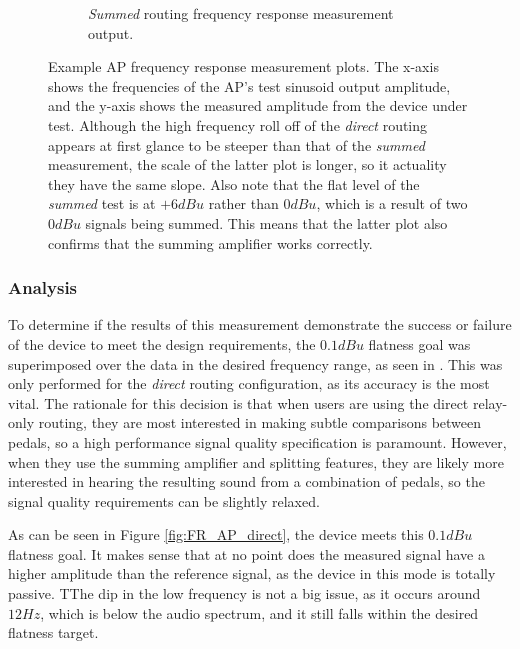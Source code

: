 \begin{figure}
\begin{subfigure}{0.45\textwidth}
				\caption{\emph{Summed} routing frequency response measurement output.}
				\label{fig:FR_AP_sum}
			\end{subfigure}
			\caption{Example AP frequency response measurement plots.  The x-axis shows the frequencies of the AP's test sinusoid output amplitude, and the y-axis shows the measured amplitude from the device under test.  Although the high frequency roll off of the \emph{direct} routing appears at first glance to be steeper than that of the \emph{summed} measurement, the scale of the latter plot is longer, so it actuality they have the same slope.  Also note that the flat level of the \emph{summed} test is at $+6dBu$ rather than $0dBu$, which is a result of two $0dBu$ signals being summed.  This means that the latter plot also confirms that the summing amplifier works correctly.}
			\label{fig:FR_AP}
		\end{figure}

		\subsubsection{Analysis}

		To determine if the results of this measurement demonstrate the success or failure of the device to meet the design requirements, the $0.1dBu$ flatness goal was superimposed over the data in the desired frequency range, as seen in .  This was only performed for the \emph{direct} routing configuration, as its accuracy is the most vital.  The rationale for this decision is that when users are using the direct relay-only routing, they are most interested in making subtle comparisons between pedals, so a high performance signal quality specification is paramount.  However, when they use the summing amplifier and splitting features, they are likely more interested in hearing the resulting sound from a combination of pedals, so the signal quality requirements can be slightly relaxed.


		As can be seen in Figure \ref{fig:FR_AP_direct}, the device meets this $0.1dBu$ flatness goal.  It makes sense that at no point does the measured signal have a higher amplitude than the reference signal, as the device in this mode is totally passive.  TThe dip in the low frequency is not a big issue, as it occurs around $12Hz$, which is below the audio spectrum, and it still falls within the desired flatness target.

